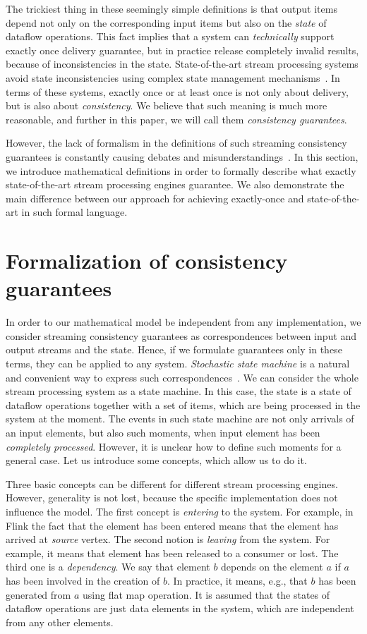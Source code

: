 \documentclass[sigconf]{acmart}
\theoremstyle{remark}
\begin{document}
The trickiest thing in these seemingly simple definitions is that output items depend not only on the corresponding input items but also on the {\em state} of dataflow operations. This fact implies that a system can {\em technically} support exactly once delivery guarantee, but in practice release completely invalid results, because of inconsistencies in the state. State-of-the-art stream processing systems avoid state inconsistencies using complex state management mechanisms~\cite{Carbone:2017:SMA:3137765.3137777}. In terms of these systems, exactly once or at least once is not only about delivery, but is also about {\em consistency}. We believe that such meaning is much more reasonable, and further in this paper, we will call them {\em consistency guarantees}.   

However, the lack of formalism in the definitions of such streaming consistency guarantees is constantly causing debates and misunderstandings~\cite{JerryPengStreamIO, PaperTrail}. In this section, we introduce mathematical definitions in order to formally describe what exactly state-of-the-art stream processing engines guarantee. We also demonstrate the main difference between our approach for achieving exactly-once and state-of-the-art in such formal language.     

\section{Formalization of consistency guarantees}

In order to our mathematical model be independent from any implementation, we consider streaming consistency guarantees as correspondences between input and output streams and the state. Hence, if we formulate guarantees only in these terms, they can be applied to any system. {\em Stochastic state machine} is a natural and convenient way to express such correspondences~\cite{ссыль}. We can consider the whole stream processing system as a state machine. In this case, the state is a state of dataflow operations together with a set of items, which are being processed in the system at the moment. The events in such state machine are not only arrivals of an input elements, but also such moments, when input element has been {\em completely processed}. However, it is unclear how to define such moments for a general case. Let us introduce some concepts, which allow us to do it.

Three basic concepts can be different for different stream processing engines. However, generality is not lost, because the specific implementation does not influence the model. The first concept is {\em entering} to the system. For example, in Flink the fact that the element has been entered means that the element has arrived at {\em source} vertex. The second notion is {\em leaving} from the system. For example, it means that element has been released to a consumer or lost. The third one is a {\em dependency}. We say that element $b$ depends on the element $a$ if $a$ has been involved in the creation of $b$. In practice, it means, e.g., that $b$ has been generated from $a$ using flat map operation. It is assumed that the states of dataflow operations are just data elements in the system, which are independent from any other elements.
\end{document}
